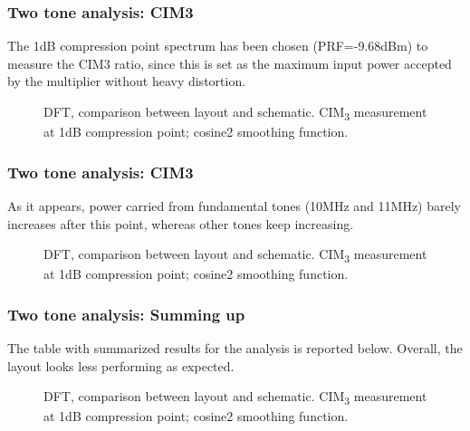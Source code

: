 \begin{frame}
\frametitle{Two tone analysis: CIM3}
The 1dB compression point spectrum has been chosen (PRF=-9.68dBm) to measure the CIM3 ratio, since this is set as the maximum input power accepted by the multiplier without heavy distortion.
\begin{figure}[H] 
	\centering
	\caption{DFT, comparison between layout and schematic. CIM\textsubscript{3} measurement at 1dB compression point; cosine2 smoothing function. }
	\label{fig:DFT_2ton_zoom}
\end{figure}
\end{frame}

\begin{frame}
\frametitle{Two tone analysis: CIM3}
As it appears, power carried from fundamental tones (10MHz and 11MHz) barely increases after this point, whereas other tones keep increasing. 
\begin{figure}[H] 
	\centering
	\caption{DFT, comparison between layout and schematic. CIM\textsubscript{3} measurement at 1dB compression point; cosine2 smoothing function. }
	\label{fig:DFT_2ton_zoom}
\end{figure}
\end{frame}

\begin{frame}
\frametitle{Two tone analysis: Summing up}
The table with summarized results for the analysis is reported below. Overall, the layout looks less performing as expected. 
\begin{figure}[H] 
	\centering
	\caption{DFT, comparison between layout and schematic. CIM\textsubscript{3} measurement at 1dB compression point; cosine2 smoothing function. }
	\label{fig:DFT_2ton_zoom}
\end{figure}
\end{frame}